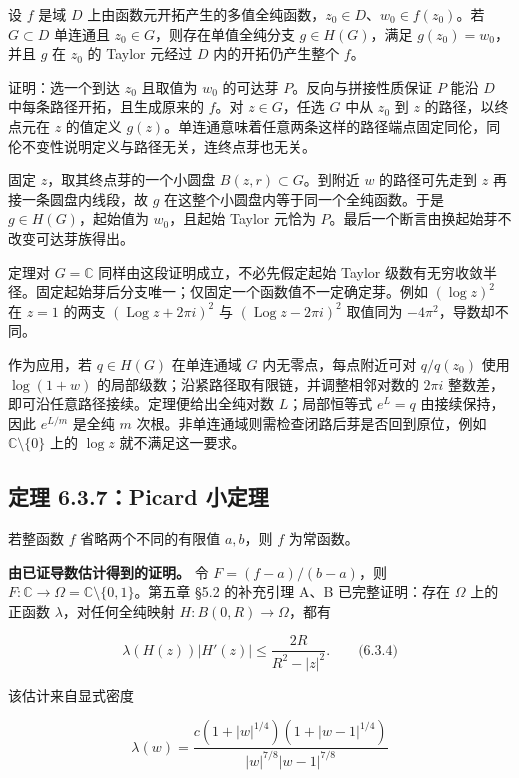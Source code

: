 \documentclass[11pt,a4paper]{article}
\begin{document}
设 \(f\) 是域 \(D\)
上由函数元开拓产生的多值全纯函数，\(z_0\in D\)、\(w_0\in f(z_0)\)。若
\(G\subset D\) 单连通且 \(z_0\in G\)，则存在单值全纯分支
\(g\in H(G)\)，满足 \(g(z_0)=w_0\)，并且 \(g\) 在 \(z_0\) 的 Taylor
元经过 \(D\) 内的开拓仍产生整个 \(f\)。

证明：选一个到达 \(z_0\) 且取值为 \(w_0\) 的可达芽
\(P\)。反向与拼接性质保证 \(P\) 能沿 \(D\) 中每条路径开拓，且生成原来的
\(f\)。对 \(z\in G\)，任选 \(G\) 中从 \(z_0\) 到 \(z\)
的路径，以终点元在 \(z\) 的值定义
\(g(z)\)。单连通意味着任意两条这样的路径端点固定同伦，同伦不变性说明定义与路径无关，连终点芽也无关。

固定 \(z\)，取其终点芽的一个小圆盘 \(B(z,r)\subset G\)。到附近 \(w\)
的路径可先走到 \(z\) 再接一条圆盘内线段，故 \(g\)
在这整个小圆盘内等于同一个全纯函数。于是 \(g\in H(G)\)，起始值为
\(w_0\)，且起始 Taylor 元恰为
\(P\)。最后一个断言由换起始芽不改变可达芽族得出。

定理对 \(G=\mathbb C\) 同样由这段证明成立，不必先假定起始 Taylor
级数有无穷收敛半径。固定起始芽后分支唯一；仅固定一个函数值不一定确定芽。例如
\((\log z)^2\) 在 \(z=1\) 的两支 \((\operatorname{Log}z+2\pi i)^2\) 与
\((\operatorname{Log}z-2\pi i)^2\) 取值同为 \(-4\pi^2\)，导数却不同。

作为应用，若 \(q\in H(G)\) 在单连通域 \(G\) 内无零点，每点附近可对
\(q/q(z_0)\) 使用 \(\log(1+w)\)
的局部级数；沿紧路径取有限链，并调整相邻对数的 \(2\pi i\)
整数差，即可沿任意路径接续。定理便给出全纯对数 \(L\)；局部恒等式
\(e^L=q\) 由接续保持，因此 \(e^{L/m}\) 是全纯 \(m\)
次根。非单连通域则需检查闭路后芽是否回到原位，例如
\(\mathbb C\setminus\{0\}\) 上的 \(\log z\) 就不满足这一要求。

\subsection{定理 6.3.7：Picard 小定理}\label{ch06-s3-heading-8}

若整函数 \(f\) 省略两个不同的有限值 \(a,b\)，则 \(f\) 为常函数。

\textbf{由已证导数估计得到的证明。} 令 \(F=(f-a)/(b-a)\)，则
\(F:\mathbb C\to\Omega=\mathbb C\setminus\{0,1\}\)。第五章 §5.2
的补充引理 A、B 已完整证明：存在 \(\Omega\) 上的正函数
\(\lambda\)，对任何全纯映射 \(H:B(0,R)\to\Omega\)，都有

\[
\lambda(H(z))|H'(z)|\le\frac{2R}{R^2-|z|^2}.
\qquad\text{(6.3.4)}
\]

该估计来自显式密度

\[
\lambda(w)=\frac{c(1+|w|^{1/4})(1+|w-1|^{1/4})}
{|w|^{7/8}|w-1|^{7/8}}
\]
\end{document}
